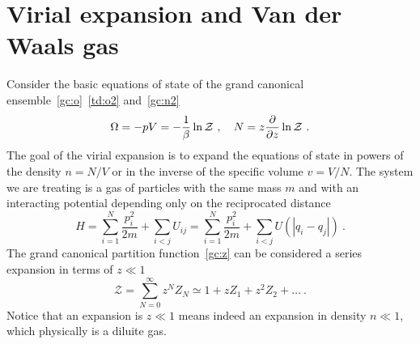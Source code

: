 \section{Virial expansion and Van der Waals gas} 

    Consider the basic equations of state of the grand canonical ensemble~\eqref{gc:o}~\eqref{td:o2} and~\eqref{gc:n2} 
    \begin{equation}\label{gc:es}
        \Omega = - pV = - \frac{1}{\beta} \ln \mathcal Z~, \quad N = z \frac{\partial}{\partial z} \ln \mathcal Z ~.
    \end{equation}
    The goal of the virial expansion is to expand the equations of state in powers of the density $n = N/V$ or in the inverse of the specific volume $v = V / N$. The system we are treating is a gas of particles with the same mass $m$ and with an interacting potential depending only on the reciprocated distance 
    \begin{equation*}
        H = \sum_{i=1}^N \frac{p_i^2}{2m} + \sum_{i < j} U_{ij} = \sum_{i=1}^N \frac{p_i^2}{2m} + \sum_{i < j} U (|q_i - q_j|) ~.
    \end{equation*}
    The grand canonical partition function~\eqref{gc:z} can be considered a series expansion in terms of $z \ll 1$ 
    \begin{equation*}
        \mathcal Z = \sum_{N=0}^\infty z^N Z_N \simeq 1 + z Z_1 + z^2 Z_2 + \ldots ~.
    \end{equation*}
    Notice that an expansion is $z \ll 1$ means indeed an expansion in density $n \ll 1$, which physically is a diluite gas.

